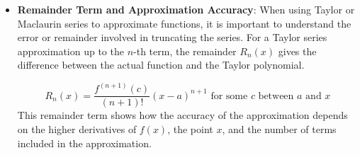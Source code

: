 \begin{itemize}
\begin{itemize}
    \item \textbf{Cosine Function} \( \cos(x) \):
        \[
        \cos(x) = 1 - \frac{x^2}{2!} + \frac{x^4}{4!} - \cdots = \sum_{n=0}^{\infty} (-1)^n \frac{x^{2n}}{(2n)!}
        \]
        Similar to the sine series, the cosine function’s Maclaurin series consists of even powers of \( x \), with alternating signs. This series provides an accurate approximation for \( \cos(x) \) near \( x = 0 \).

    \item \textbf{Logarithmic Function} \( \ln(1 + x) \) (valid for \( -1 < x \leq 1 \)):
        \[
        \ln(1 + x) = x - \frac{x^2}{2} + \frac{x^3}{3} - \frac{x^4}{4} + \cdots = \sum_{n=1}^{\infty} (-1)^{n+1} \frac{x^n}{n}
        \]
        This series is useful in approximating logarithmic functions around \( x = 0 \).

    \item \textbf{Arc Tangent Function} \( \arctan(x) \) (valid for \( -1 \leq x \leq 1 \)):
        \[
        \arctan(x) = x - \frac{x^3}{3} + \frac{x^5}{5} - \cdots = \sum_{n=0}^{\infty} (-1)^n \frac{x^{2n+1}}{2n+1}
        \]
        This series provides an approximation for the inverse tangent function near \( x = 0 \), often useful in trigonometric applications.

    \end{itemize}

\item \textbf{Remainder Term and Approximation Accuracy}:
When using Taylor or Maclaurin series to approximate functions, it is important to understand the error or remainder involved in truncating the series. For a Taylor series approximation up to the \( n \)-th term, the remainder \( R_n(x) \) gives the difference between the actual function and the Taylor polynomial.

    \[
    R_n(x) = \frac{f^{(n+1)}(c)}{(n+1)!} (x-a)^{n+1} \text{ for some } c \text{ between } a \text{ and } x
    \]
This remainder term shows how the accuracy of the approximation depends on the higher derivatives of \( f(x) \), the point \( x \), and the number of terms included in the approximation.

\end{itemize}

